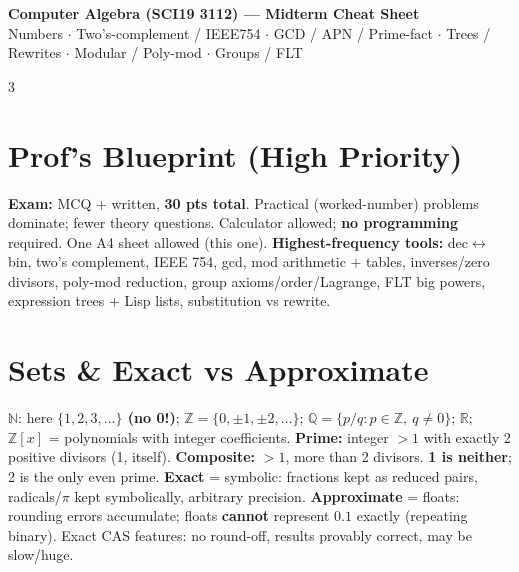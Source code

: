 \documentclass[9pt]{extarticle}
\newcommand{\hl}[1]{\textbf{\textcolor{BrickRed}{#1}}}
\newcommand{\sepline}{\vspace{1pt}{\color{RoyalBlue}\hrule}\vspace{3pt}}
\begin{document}
\footnotesize

\begin{center}
\colorbox{RoyalBlue!15}{\parbox{0.97\linewidth}{\centering
{\bfseries\large\color{RoyalBlue} Computer Algebra (SCI19 3112) --- Midterm Cheat Sheet}\\[1.5pt]
{\scriptsize\color{RoyalBlue!70!black} Numbers $\cdot$ Two's-complement / IEEE754 $\cdot$ GCD / APN / Prime-fact $\cdot$ Trees / Rewrites $\cdot$ Modular / Poly-mod $\cdot$ Groups / FLT}}}
\end{center}
\sepline

\begin{multicols}{3}

\section{Prof's Blueprint (High Priority)}
\hl{Exam:} MCQ + written, \hl{30 pts total}. Practical (worked-number) problems dominate; fewer theory questions. Calculator allowed; \hl{no programming} required. One A4 sheet allowed (this one).
\hl{Highest-frequency tools:} dec$\leftrightarrow$bin, two's complement, IEEE 754, gcd, mod arithmetic + tables, inverses/zero divisors, poly-mod reduction, group axioms/order/Lagrange, FLT big powers, expression trees + Lisp lists, substitution vs rewrite.

\section{Sets \& Exact vs Approximate}
$\mathbb N$: here \hl{$\{1,2,3,\ldots\}$ (no 0!)}; $\mathbb Z=\{0,\pm1,\pm2,\ldots\}$; $\mathbb Q=\{p/q:p\in\mathbb Z,\ q\ne0\}$; $\mathbb R$; $\mathbb Z[x]$ = polynomials with integer coefficients.
\hl{Prime:} integer $>1$ with exactly 2 positive divisors (1, itself). \hl{Composite:} $>1$, more than 2 divisors. \hl{1 is neither}; 2 is the only even prime.
\hl{Exact} = symbolic: fractions kept as reduced pairs, radicals/$\pi$ kept symbolically, arbitrary precision. \hl{Approximate} = floats: rounding errors accumulate; floats \hl{cannot} represent $0.1$ exactly (repeating binary). Exact CAS features: no round-off, results provably correct, may be slow/huge.


\end{multicols}
\end{document}
